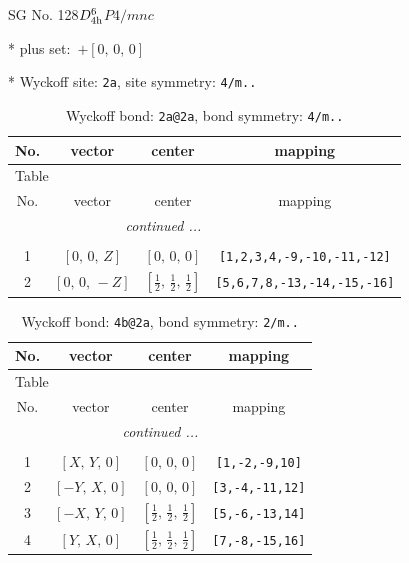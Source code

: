\documentclass[fleqn,8pt]{jsarticle}
\begin{document}
\setcounter{MaxMatrixCols}{32}

\renewcommand{\tablename}{Table~}
\renewcommand{\figurename}{Figure~}
\begin{center}
\LARGE
SG No. 128\quad$D_{\rm 4h}^{6}$\quad$P4/mnc$\quad[ tetragonal ]
\end{center}

* plus set:\,\,\,$+\left[ 0,\, 0,\, 0 \right]$


* Wyckoff site: {\tt 2a}, site symmetry: {\tt 4/m..}
\renewcommand{\arraystretch}{1.2}
\begin{longtable}{cccc}
\caption{Wyckoff bond: {\tt 2a@2a}, bond symmetry: {\tt 4/m..}}
 \\
 \hline \hline
No. & vector & center & mapping \\ \hline \endfirsthead

\multicolumn{3}{l}{\tablename\ \thetable{}} \\
 \hline \hline
No. & vector & center & mapping \\ \hline \endhead

 \hline \hline
\multicolumn{3}{r}{\footnotesize\it continued ...} \\ \endfoot

 \hline \hline
\multicolumn{3}{r}{} \\ \endlastfoot

1 & $\left[ 0,\, 0,\, Z \right]$ & $\left[ 0,\, 0,\, 0 \right]$ & {\tt [1,2,3,4,-9,-10,-11,-12]} \\ \hline
2 & $\left[ 0,\, 0,\, - Z \right]$ & $\left[ \frac{1}{2},\, \frac{1}{2},\, \frac{1}{2} \right]$ & {\tt [5,6,7,8,-13,-14,-15,-16]} \\
\end{longtable}
\renewcommand{\arraystretch}{1.2}
\begin{longtable}{cccc}
\caption{Wyckoff bond: {\tt 4b@2a}, bond symmetry: {\tt 2/m..}}
 \\
 \hline \hline
No. & vector & center & mapping \\ \hline \endfirsthead

\multicolumn{3}{l}{\tablename\ \thetable{}} \\
 \hline \hline
No. & vector & center & mapping \\ \hline \endhead

 \hline \hline
\multicolumn{3}{r}{\footnotesize\it continued ...} \\ \endfoot

 \hline \hline
\multicolumn{3}{r}{} \\ \endlastfoot

1 & $\left[ X,\, Y,\, 0 \right]$ & $\left[ 0,\, 0,\, 0 \right]$ & {\tt [1,-2,-9,10]} \\ \hline
2 & $\left[ - Y,\, X,\, 0 \right]$ & $\left[ 0,\, 0,\, 0 \right]$ & {\tt [3,-4,-11,12]} \\ \hline
3 & $\left[ - X,\, Y,\, 0 \right]$ & $\left[ \frac{1}{2},\, \frac{1}{2},\, \frac{1}{2} \right]$ & {\tt [5,-6,-13,14]} \\ \hline
4 & $\left[ Y,\, X,\, 0 \right]$ & $\left[ \frac{1}{2},\, \frac{1}{2},\, \frac{1}{2} \right]$ & {\tt [7,-8,-15,16]} \\
\end{longtable}
\end{document}
